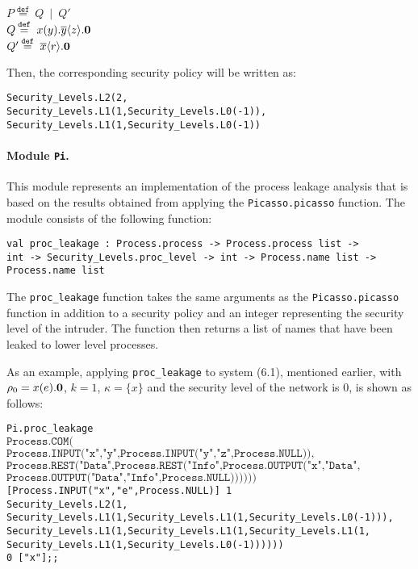 \documentclass[10pt,a4paper,final,oneside,fleqn]{book}
\newcommand*{\eqdef}{\mathbin{\mathop{=}\limits^{\texttt{def}}}}
\begin{document}
\noindent
$P\eqdef~Q~\mid~Q'$\\
$Q\eqdef~x(y).\overline{y}\langle z\rangle.{\bf 0}$\\
$Q'\eqdef~\overline{x}\langle r\rangle.{\bf 0}$\vspace{6mm}

\noindent
Then, the corresponding security policy will be written as:\vspace{6mm}

\noindent
\texttt{Security\_Levels.L2(2,}\\
\texttt{Security\_Levels.L1(1,Security\_Levels.L0(-1)),}\\
\texttt{Security\_Levels.L1(1,Security\_Levels.L0(-1))}

\paragraph{Module \texttt{Pi}.}
This module represents an implementation of the process leakage analysis that is based on the results obtained from applying the \texttt{Picasso.picasso} function.  The module consists of the following function:\vspace{6mm}

\noindent
\texttt{val proc\_leakage : Process.process -> Process.process list ->}\\
\texttt{int -> Security\_Levels.proc\_level -> int -> Process.name list ->}\\
\texttt{Process.name list}\vspace{6mm}

\noindent
The \texttt{proc\_leakage} function takes the same arguments as the \texttt{Picasso.picasso} function in addition to a security policy and an integer representing the security level of the intruder.  The function then returns a list of names that have been leaked to lower level processes.

As an example, applying \texttt{proc\_leakage} to system (6.1), mentioned earlier, with $\rho_0=x(e).{\bf 0}$, $k=1$, $\kappa=\{x\}$ and the security level of the network is $0$, is shown as follows:\vspace{6mm}

\noindent
\texttt{Pi.proc\_leakage}\\
$\texttt{Process.COM(}$\\
$\texttt{Process.INPUT("x","y",Process.INPUT("y","z",Process.NULL)),}$\\
$\texttt{Process.REST("Data",Process.REST("Info",Process.OUTPUT("x","Data",}$\\
$\texttt{Process.OUTPUT("Data","Info",Process.NULL))))))}$\\
\texttt{[Process.INPUT("x","e",Process.NULL)] 1}\\
\texttt{Security\_Levels.L2(1,}\\
\texttt{Security\_Levels.L1(1,Security\_Levels.L1(1,Security\_Levels.L0(-1))),}\\
\texttt{Security\_Levels.L1(1,Security\_Levels.L1(1,Security\_Levels.L1(1,}\\
\texttt{Security\_Levels.L1(1,Security\_Levels.L0(-1))))))}\\
\texttt{0 ["x"];;}\vspace{6mm}
\end{document}
